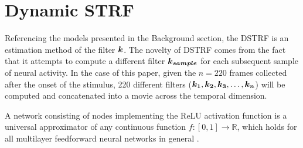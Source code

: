 
\section{Dynamic STRF}
Referencing the models presented in the Background section, the DSTRF is an estimation method of the filter $\bm{k}$. The novelty of DSTRF comes from the fact that it attempts to compute a different filter $\bm{k_{sample}}$ for each subsequent sample of neural activity. In the case of this paper, given the $n = 220$ frames collected after the onset of the stimulus, 220 different filters ($\bm{k_1}, \bm{k_2}, \bm{k_3}, \dots, \bm{k_n}$) will be computed and concatenated into a movie across the temporal dimension. 

A network consisting of nodes implementing the ReLU activation function is a universal approximator of any continuous function $f: [0, 1] \rightarrow \mathbb{R}$, which holds for all multilayer feedforward neural networks in general \parencite{hornikMultilayerFeedforwardNetworks1989, huangReLUNetworksAre2020}. 

